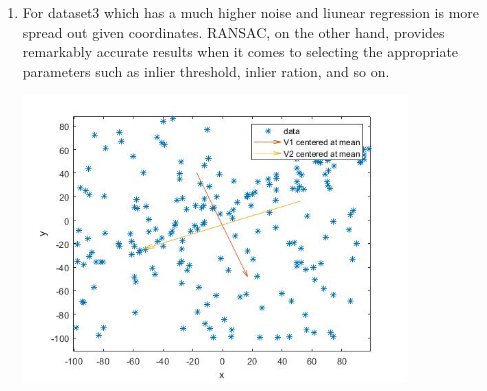 \documentclass{article}
\begin{document}
\begin{enumerate}
    \item For dataset3 which has a much higher noise and liunear regression is more spread out given coordinates. RANSAC, on the other hand, provides remarkably accurate results when it comes to selecting the appropriate parameters such as inlier threshold, inlier ration, and so on.
    
    \begin{figure3.jpg}
\centerline{\includegraphics[width=4in, height=3in]{figure3.jpg}}
\end{figure3.jpg}


\end{enumerate}
\end{document}
